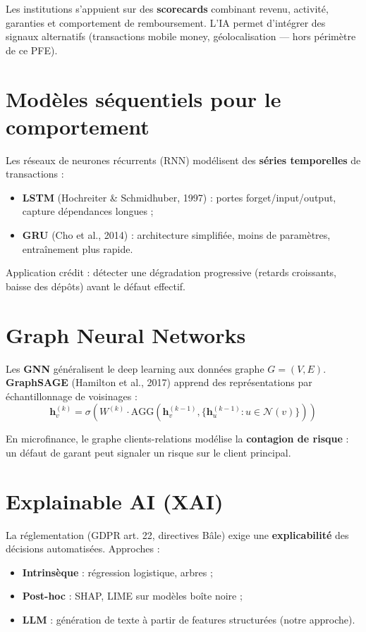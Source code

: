 Les institutions s'appuient sur des \textbf{scorecards} combinant revenu, activité, garanties et comportement de remboursement. L'IA permet d'intégrer des signaux alternatifs (transactions mobile money, géolocalisation — hors périmètre de ce PFE).

\section{Modèles séquentiels pour le comportement}

Les réseaux de neurones récurrents (RNN) modélisent des \textbf{séries temporelles} de transactions :
\begin{itemize}[leftmargin=*]
  \item \textbf{LSTM} (Hochreiter \& Schmidhuber, 1997) : portes forget/input/output, capture dépendances longues ;
  \item \textbf{GRU} (Cho et al., 2014) : architecture simplifiée, moins de paramètres, entraînement plus rapide.
\end{itemize}

Application crédit : détecter une dégradation progressive (retards croissants, baisse des dépôts) avant le défaut effectif.

\section{Graph Neural Networks}

Les \textbf{GNN} généralisent le deep learning aux données graphe $G=(V,E)$. \textbf{GraphSAGE} (Hamilton et al., 2017) apprend des représentations par échantillonnage de voisinages :
\[
\mathbf{h}_v^{(k)} = \sigma\left(W^{(k)} \cdot \text{AGG}\left(\mathbf{h}_v^{(k-1)}, \{\mathbf{h}_u^{(k-1)} : u \in \mathcal{N}(v)\}\right)\right)
\]

En microfinance, le graphe clients-relations modélise la \textbf{contagion de risque} : un défaut de garant peut signaler un risque sur le client principal.

\section{Explainable AI (XAI)}

La réglementation (GDPR art. 22, directives Bâle) exige une \textbf{explicabilité} des décisions automatisées. Approches :
\begin{itemize}[leftmargin=*]
  \item \textbf{Intrinsèque} : régression logistique, arbres ;
  \item \textbf{Post-hoc} : SHAP, LIME sur modèles boîte noire ;
  \item \textbf{LLM} : génération de texte à partir de features structurées (notre approche).
\end{itemize}

